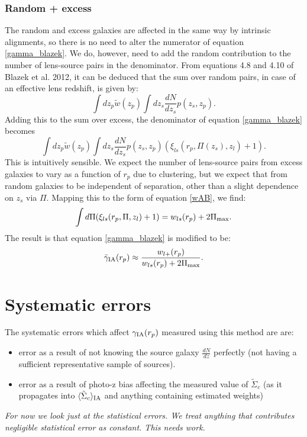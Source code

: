 \documentclass[onecolumn,amsmath,aps,fleqn, superscriptaddress]{revtex4}
\begin{document}
\subsubsection*{Random + excess}
The random and excess galaxies are affected in the same way by intrinsic alignments, so there is no need to alter the numerator of equation \ref{gamma_blazek}.
 We do, however, need to add the random contribution to the number of lens-source pairs in the denominator. From equations 4.8 and 4.10 of Blazek et al. 2012, it can be deduced that the sum over random pairs, in case of an effective lens redshift, is given by:
\begin{equation}
\int dz_p \tilde{w}(z_p) \int dz_s \frac{dN}{dz_s} p(z_s, z_p).
\end{equation}
Adding this to the sum over excess, the denominator of equation \ref{gamma_blazek} becomes
\begin{equation}
\int dz_p \tilde{w}(z_p) \int dz_s \frac{dN}{dz_s} p(z_s, z_p) \left(\xi_{ls}(r_p, \Pi(z_s), z_l) + 1\right).
\label{denom_rand}
\end{equation}
This is intuitively sensible. We expect the number of lens-source pairs from excess galaxies to vary as a function of $r_p$ due to clustering, but we expect that from random galaxies to be independent of separation, other than a slight dependence on $z_s$ via $\Pi$. Mapping this to the form of equation \ref{wAB}, we find:
\begin{equation}
\int d\Pi (\xi_{ls}(r_p, \Pi, z_l) + 1) = w_{ls}(r_p) + 2\Pi_{\rm max}.
\label{wl}
\end{equation}
The result is that equation \ref{gamma_blazek} is modified to be:
\begin{equation}
\bar{\gamma}_{\rm IA}(r_p) \approx \frac{w_{l+}(r_p)}{w_{ls}(r_p) + 2 \Pi_{\rm max}}.
\label{gamma_blazek_randoms}
\end{equation} 

\section{Systematic errors}
The systematic errors which affect $\gamma_{\rm IA}(r_p)$ measured using this method are are:
\begin{itemize}
\item{error as a result of not knowing the source galaxy $\frac{dN}{dz}$ perfectly (not having a sufficient representative sample of sources).}
\item{error as a result of photo-z bias affecting the measured value of $\tilde{\Sigma}_c$ (as it propagates into $\langle \tilde{\Sigma}_c\rangle_{\rm IA}$ and anything containing estimated weights)}
\end{itemize}
{\it For now we look just at the statistical errors. We treat anything that contributes negligible statistical error as constant. This needs work.}
\end{document}
